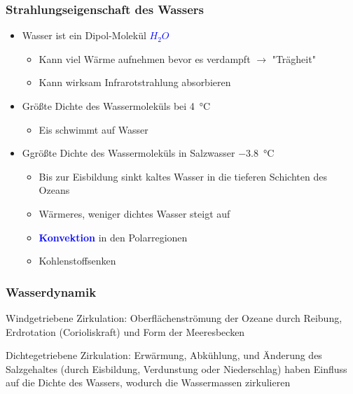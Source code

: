 \begin{frame}
	\frametitle{Strahlungseigenschaft des Wassers} %
	\begin{itemize}
		\item Wasser ist ein Dipol-Molekül \textcolor{blue}{$H_2O$}
		\begin{itemize}			
			\item<2->[$\rightarrow$] Kann viel Wärme aufnehmen bevor es verdampft $\rightarrow$ "Trägheit"
			\item<2->[$\rightarrow$] Kann wirksam Infrarotstrahlung absorbieren
		\end{itemize}
		
		\item<3-> Größte Dichte des Wassermoleküls bei \SI{4}{\degreeCelsius}
		\begin{itemize}
			\item<4->[$\rightarrow$] Eis schwimmt auf Wasser
		\end{itemize}		
		\item<5->Ggrößte Dichte des Wassermoleküls in Salzwasser \SI{-3,8}{\degreeCelsius}
		\begin{itemize}
			\item<6->[$\rightarrow$] Bis zur Eisbildung sinkt kaltes Wasser in die tieferen Schichten des Ozeans
			\item<6-> [$\rightarrow$] Wärmeres, weniger dichtes Wasser steigt auf
			\item<6-> [] \textbf{\textcolor{blue}{Konvektion}} in den Polarregionen 
			\item<6-> [$\rightarrow$] Kohlenstoffsenken
		\end{itemize}
	\end{itemize}


\end{frame}

\begin{frame}
	\frametitle{Wasserdynamik} %
	\begin{block}{Windgetriebene Zirkulation: } %
		Oberflächenströmung der Ozeane durch Reibung, Erdrotation (Corioliskraft) und Form der Meeresbecken 
	\end{block}
	\begin{block}{Dichtegetriebene Zirkulation: }  %
		Erwärmung, Abkühlung, und Änderung des Salzgehaltes (durch Eisbildung, Verdunstung oder Niederschlag) haben Einfluss auf die Dichte des Wassers, wodurch die Wassermassen zirkulieren
	\end{block}
	
\end{frame}


